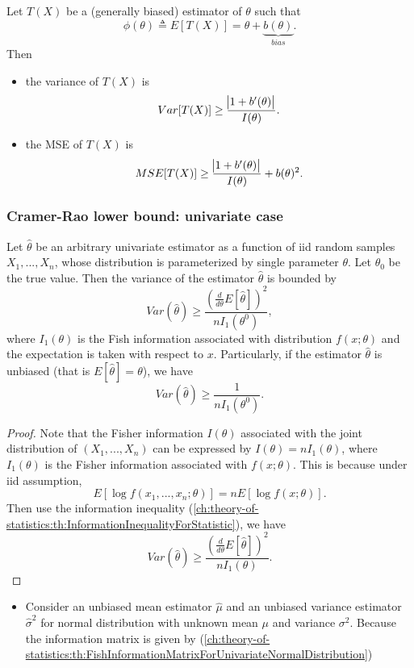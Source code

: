 \begin{refsection}
\begin{corollary}
Let $T(X)$ be a (generally biased) estimator of $\theta$ such that
$$\phi(\theta) \triangleq E[T(X)] = \theta + \underbrace{b(\theta)}_{bias}.$$
Then
\begin{itemize}
	\item the variance of $T(X)$ is
	$$Var[T(X)] \geq \frac{\abs{1 + b'(\theta)}}{I(\theta)}.$$
	\item the MSE of $T(X)$ is
	$$MSE[T(X)] \geq \frac{\abs{1 + b'(\theta)}}{I(\theta)} + b(\theta)^2.$$
\end{itemize}
\end{corollary}


\subsubsection{Cramer-Rao lower bound: univariate case}

\begin{theorem}
Let $\hat{\theta}$ be an arbitrary univariate estimator as a function of iid random samples $X_1,...,X_n$, whose distribution is parameterized by single parameter $\theta$. Let $\theta_0$ be the true value.
Then the variance of the estimator $\hat{\theta}$ is bounded by
	$$Var(\hat{\theta}) \geq \frac{(\frac{d}{d\theta}E[\hat{\theta}])^2}{nI_1(\theta^0)},$$
where $I_1(\theta)$ is the Fish information associated with distribution $f(x;\theta)$ and the expectation is taken with respect to $x$.	
	Particularly, if the estimator $\hat{\theta}$ is unbiased (that is $E[\hat{\theta}] = \theta$), we have
	$$Var(\hat{\theta}) \geq \frac{1}{nI_1(\theta^0)}.$$
\end{theorem}
\begin{proof}
Note that the Fisher information $I(\theta)$ associated with the joint distribution of $(X_1,...,X_n)$ can be expressed by $I(\theta) = nI_1(\theta)$, where $I_1(\theta)$ is the Fisher information associated with $f(x;\theta)$. This is because under iid assumption, 
$$E[\log f(x_1,...,x_n;\theta)] = n E[\log f(x;\theta)].$$
Then use the information inequality (\autoref{ch:theory-of-statistics:th:InformationInequalityForStatistic}), we have
$$Var(\hat{\theta}) \geq \frac{(\frac{d}{d\theta}E[\hat{\theta}])^2}{nI_1(\theta)}.$$
\end{proof}

\begin{example}\hfill
	\begin{itemize}
		\item Consider an unbiased mean estimator $\hat{\mu}$ and an unbiased variance estimator $\hat{\sigma}^2$  for normal distribution with unknown mean $\mu$ and variance $\sigma^2$. 
		Because the information matrix is given by (\autoref{ch:theory-of-statistics:th:FishInformationMatrixForUnivariateNormalDistribution})
		

\end{itemize}
\end{example}
\end{refsection}
